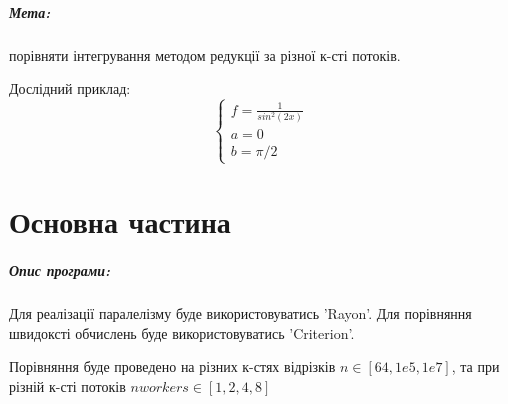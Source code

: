 \documentclass{udstu}
\begin{document}

\tableofcontents

\intro

\paragraph{\textbf{Мета:}} порівняти інтегрування методом редукції за різної к-сті потоків.

Дослідний приклад:
\begin{equation*}
\begin{cases}
	f = \frac{1}{sin^2(2x)} \\
	a = 0 \\
	b = \pi/2
\end{cases}
\end{equation*}


\chapter{Основна частина}
\label{chap:1}

\paragraph{\textbf{Опис програми:}}

Для реалізації паралелізму буде використовуватись 'Rayon'.
Для порівняння швидоксті обчислень буде використовуватись 'Criterion'.

Порівняння буде проведено на різних к-стях відрізків $n \in [64, 1e5, 1e7]$,
та при різній к-сті потоків $nworkers \in [1,2,4,8]$
\end{document}
